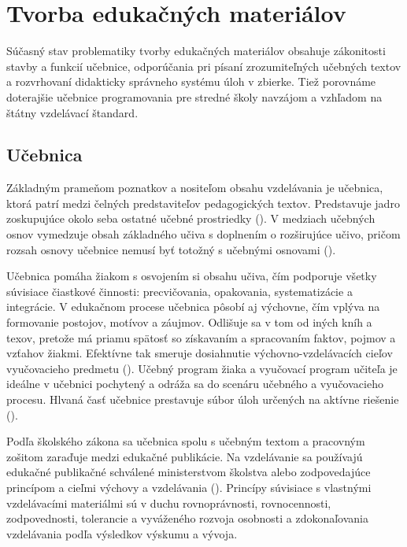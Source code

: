 \chapter{Tvorba edukačných materiálov} 
Súčasný stav problematiky tvorby edukačných materiálov obsahuje zákonitosti stavby a funkcií učebnice, odporúčania pri písaní zrozumiteľných učebných textov a rozvrhovaní didakticky správneho systému úloh v zbierke. Tiež porovnáme doterajšie učebnice programovania pre stredné školy navzájom a vzhľadom na štátny vzdelávací štandard. 

\section{Učebnica}
Základným prameňom poznatkov a nositeľom obsahu vzdelávania je učebnica, ktorá patrí medzi čelných predstaviteľov pedagogických textov. Predstavuje jadro zoskupujúce okolo seba ostatné učebné prostriedky (\cite{zujev_ako_1986}). V medziach učebných osnov vymedzuje obsah základného učiva s doplnením o rozširujúce učivo, pričom rozsah osnovy učebnice nemusí byť totožný s učebnými osnovami (\cite{mlady_tvorba_1988}). 

Učebnica pomáha žiakom s osvojením si obsahu učiva, čím podporuje všetky súvisiace čiastkové činnosti: precvičovania, opakovania, systematizácie a integrácie. V edukačnom procese učebnica pôsobí aj výchovne, čím vplýva na formovanie postojov, motívov a záujmov. Odlišuje sa v tom od iných kníh a texov, pretože má priamu spätosť so získavaním a spracovaním faktov, pojmov a vzťahov žiakmi. Efektívne tak smeruje dosiahnutie výchovno-vzdelávacích cieľov vyučovacieho predmetu (\cite{gavora_ziak_1992}). Učebný program žiaka a vyučovací program učiteľa je ideálne v učebnici pochytený a odráža sa do scenáru učebného a vyučovacieho procesu. Hlvaná časť učebnice prestavuje súbor úloh určených na aktívne riešenie (\cite{pavlovkin_ziak_1989}).

Podľa školského zákona sa učebnica spolu s učebným textom a pracovným zošitom zaraďuje medzi edukačné publikácie. Na vzdelávanie sa používajú edukačné publikačné schválené ministerstvom školstva alebo zodpovedajúce princípom a cieľmi výchovy a vzdelávania (\cite{skolsky_zakon}). Princípy súvisiace s vlastnými vzdelávacími materiálmi sú v duchu rovnoprávnosti, rovnocennosti, zodpovednosti, tolerancie a vyváženého rozvoja osobnosti a zdokonaľovania vzdelávania podľa výsledkov výskumu a vývoja.

